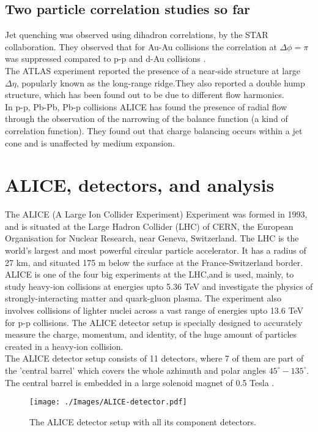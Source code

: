 \documentclass[12pt,a4paper,twoside]{report}
\begin{document}
\subsection{Two particle correlation studies so far}
Jet quenching was observed using dihadron correlations, by the STAR collaboration. They observed that for Au-Au collisions the correlation at $\Delta\phi=\pi$ was suppressed compared to p-p and d-Au collisions \cite{Ref:jetQ-paper1}\cite{Ref:jetQ-paper2}.\\
The ATLAS experiment reported the presence of a near-side structure at large $\Delta\eta$, popularly known as the long-range ridge.They also reported a double hump structure, which has been found out to be due to different flow harmonics. \cite{Ref:ATLAS-dhump}\\
In p-p, Pb-Pb, Pb-p collisions ALICE has found the presence of radial flow through the observation of the narrowing of the balance function (a kind of correlation function). They found out that charge balancing occurs within a jet cone and is unaffected by medium expansion. \cite{Ref:ALICE-blnc}
\section{ALICE, detectors, and analysis}
The ALICE (A Large Ion Collider Experiment) Experiment was formed in 1993, and is situated at the Large Hadron Collider (LHC) of CERN, the European Organisation for Nuclear Research, near Geneva, Switzerland. The LHC is the world's largest and most powerful circular particle accelerator. It has a radius of 27 km, and situated 175 m below the surface at the France-Switzerland border. ALICE is one of the four big experiments at the LHC,and is used, mainly, to study heavy-ion collisions at energies upto 5.36 TeV and investigate the physics of strongly-interacting matter and quark-gluon plasma. The experiment also involves collisions of lighter nuclei across a vast range of energies upto 13.6 TeV for p-p collisions. The ALICE detector setup is specially designed to accurately measure the charge, momentum, and identity, of the huge amount of particles created in a heavy-ion collision.\\

The ALICE detector setup consists of 11 detectors, where 7 of them are part of the 'central barrel' which covers the whole azhimuth and polar angles $45^\circ-135^\circ$. The central barrel is embedded in a large solenoid magnet of 0.5 Tesla \cite{Ref:ALICE-detectors}.\\
\begin{figure}[H]
\texttt{[image: ./Images/ALICE-detector.pdf]}
\caption{The ALICE detector setup with all its component detectors.\cite{Ref:ALICE-detectors}}
\end{figure}
\end{document}
